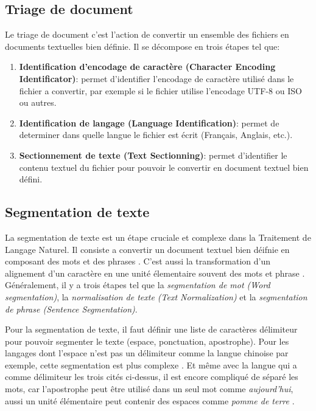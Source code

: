 \subsection{Triage de document}
Le triage de document c'est l'action de convertir un ensemble des fichiers en documents textuelles bien définie. Il se décompose en trois étapes tel que:
\begin{enumerate}
    \item \textbf{Identification d'encodage de caractère (Character Encoding Identificator)}: permet d'identifier l'encodage de caractère utilisé dans le fichier a convertir, par exemple si le fichier utilise l'encodage UTF-8 ou ISO ou autres.
    \item \textbf{Identification de langage (Language Identification)}: permet de determiner dans quelle langue le fichier est écrit (Français, Anglais, etc.).
    \item \textbf{Sectionnement de texte (Text Sectionning)}: permet d'identifier le contenu textuel du fichier pour pouvoir le convertir en document textuel bien défini.
\end{enumerate}

\subsection{Segmentation de texte}
La segmentation de texte est un étape cruciale et complexe dans la Traitement de Langage Naturel. Il consiste a convertir un document textuel bien déifnie en composant des mots et des phrases \citep{handbook-nlp}. C'est aussi la transformation d'un alignement d'un caractère en une unité élementaire souvent des mots et phrase \citep{automatic-nlp}. Généralement, il y a trois étapes tel que la \textit{segmentation de mot (Word segmentation)}, la \textit{normalisation de texte (Text Normalization)} et la \textit{segmentation de phrase (Sentence Segmentation)}.

Pour la segmentation de texte, il faut définir une liste de caractères délimiteur pour pouvoir segmenter le texte (espace, ponctuation, apostrophe). Pour les langages dont l'espace n'est pas un délimiteur comme la langue chinoise par exemple, cette segmentation est plus complexe \citep{handbook-nlp}. Et même avec la langue qui a comme délimiteur les trois cités ci-dessus, il est encore compliqué de séparé les mots, car l'apostrophe peut être utilisé dans un seul mot comme \textit{aujourd'hui}, aussi un unité élémentaire peut contenir des espaces comme \textit{pomme de terre} \citep{automatic-nlp}.

